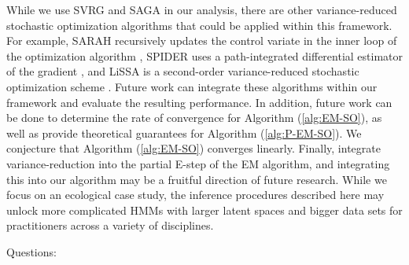 %
%

While we use SVRG and SAGA in our analysis, there are other variance-reduced stochastic optimization algorithms that could be applied within this framework. For example, SARAH recursively updates the control variate in the inner loop of the optimization algorithm \citep{Nguyen:2017}, SPIDER uses a path-integrated differential estimator of the gradient \citep{Fang:2018}, and LiSSA is a second-order variance-reduced stochastic optimization scheme \citep{Agarwal:2017}. Future work can integrate these algorithms within our framework and evaluate the resulting performance. In addition, future work can be done to determine the rate of convergence for Algorithm (\ref{alg:EM-SO}), as well as provide theoretical guarantees for Algorithm (\ref{alg:P-EM-SO}). We conjecture that Algorithm (\ref{alg:EM-SO}) converges linearly. Finally, \citet{Chen:2018} integrate variance-reduction into the partial E-step of the EM algorithm, and integrating this into our algorithm may be a fruitful direction of future research. While we focus on an ecological case study, the inference procedures described here may unlock more complicated HMMs with larger latent spaces and bigger data sets for practitioners across a variety of disciplines.



\iffalse

Questions:

